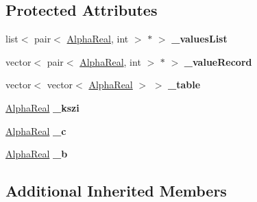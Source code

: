 \subsection*{Protected Attributes}
\begin{DoxyCompactItemize}
\item 
\hypertarget{classMultiBoost_1_1UCBKV_a21b71ad1de77364be6f5c6dae3b10a0f}{list$<$ pair$<$ \hyperlink{Defaults_8h_a80184c4fd10ab70a1a17c5f97dcd1563}{Alpha\-Real}, int $>$ $\ast$ $>$ {\bfseries \-\_\-values\-List}}\label{classMultiBoost_1_1UCBKV_a21b71ad1de77364be6f5c6dae3b10a0f}

\item 
\hypertarget{classMultiBoost_1_1UCBKV_aeebaaeb4dc1723c84334f99e0baea810}{vector$<$ pair$<$ \hyperlink{Defaults_8h_a80184c4fd10ab70a1a17c5f97dcd1563}{Alpha\-Real}, int $>$ $\ast$ $>$ {\bfseries \-\_\-value\-Record}}\label{classMultiBoost_1_1UCBKV_aeebaaeb4dc1723c84334f99e0baea810}

\item 
\hypertarget{classMultiBoost_1_1UCBKV_a27e71e98e29eff493debd8a7892b201c}{vector$<$ vector$<$ \hyperlink{Defaults_8h_a80184c4fd10ab70a1a17c5f97dcd1563}{Alpha\-Real} $>$ $>$ {\bfseries \-\_\-table}}\label{classMultiBoost_1_1UCBKV_a27e71e98e29eff493debd8a7892b201c}

\item 
\hypertarget{classMultiBoost_1_1UCBKV_a7eab6b3f4cc37ea23a292bb9570c261d}{\hyperlink{Defaults_8h_a80184c4fd10ab70a1a17c5f97dcd1563}{Alpha\-Real} {\bfseries \-\_\-kszi}}\label{classMultiBoost_1_1UCBKV_a7eab6b3f4cc37ea23a292bb9570c261d}

\item 
\hypertarget{classMultiBoost_1_1UCBKV_aa632d582977e72df9bae2e326d93fd55}{\hyperlink{Defaults_8h_a80184c4fd10ab70a1a17c5f97dcd1563}{Alpha\-Real} {\bfseries \-\_\-c}}\label{classMultiBoost_1_1UCBKV_aa632d582977e72df9bae2e326d93fd55}

\item 
\hypertarget{classMultiBoost_1_1UCBKV_a8438b91493e39ce0b1e625760e584dfb}{\hyperlink{Defaults_8h_a80184c4fd10ab70a1a17c5f97dcd1563}{Alpha\-Real} {\bfseries \-\_\-b}}\label{classMultiBoost_1_1UCBKV_a8438b91493e39ce0b1e625760e584dfb}

\end{DoxyCompactItemize}
\subsection*{Additional Inherited Members}


